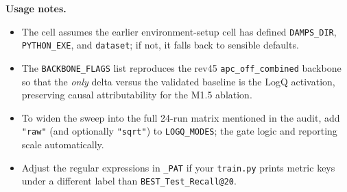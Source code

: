 \documentclass[11pt, a4paper]{article}
\begin{document}
\noindent\textbf{Usage notes.}
\begin{itemize}[leftmargin=*]
  \item The cell assumes the earlier environment-setup cell has defined
    \texttt{DAMPS\_DIR}, \texttt{PYTHON\_EXE}, and \texttt{dataset}; if not, it falls
    back to sensible defaults.
  \item The \texttt{BACKBONE\_FLAGS} list reproduces the rev45 \texttt{apc\_off\_combined}
    backbone so that the \emph{only} delta versus the validated baseline is the LogQ
    activation, preserving causal attributability for the M1.5 ablation.
  \item To widen the sweep into the full 24-run matrix mentioned in the audit, add
    \texttt{"raw"} (and optionally \texttt{"sqrt"}) to \texttt{LOGQ\_MODES}; the gate
    logic and reporting scale automatically.
  \item Adjust the regular expressions in \texttt{\_PAT} if your \texttt{train.py}
    prints metric keys under a different label than \texttt{BEST\_Test\_Recall@20}.
\end{itemize}
\end{document}
